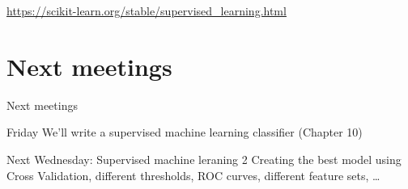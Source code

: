 \documentclass{beamer}
\begin{document}
\begin{frame}
\large{\url{https://scikit-learn.org/stable/supervised_learning.html}}
\end{frame}




\section{Next meetings}
\begin{frame}{Next meetings}
\begin{block}{Friday}
We'll write a supervised machine learning classifier (Chapter 10)
\end{block}

\begin{block}{Next Wednesday: Supervised machine leraning 2}
Creating the best model using Cross Validation, different thresholds, ROC curves, different feature sets, \ldots
\end{block}



\end{frame}
\end{document}
